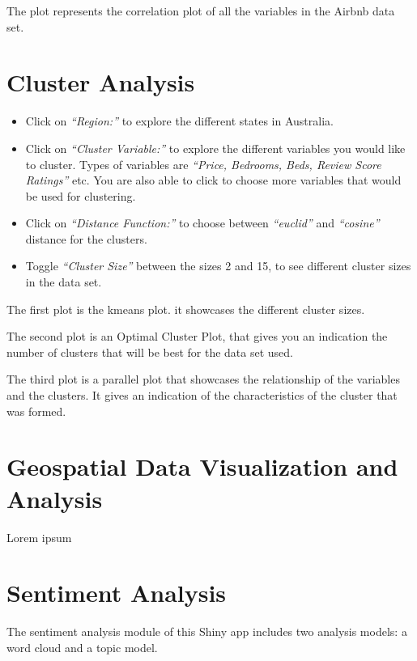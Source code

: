 \documentclass[
]{article}
\providecommand{\tightlist}{%
  \setlength{\itemsep}{0pt}\setlength{\parskip}{0pt}}
\begin{document}
The plot represents the correlation plot of all the variables in the
Airbnb data set.

\hypertarget{cluster-analysis}{%
\section{Cluster Analysis}\label{cluster-analysis}}

\begin{itemize}
\tightlist
\item
  Click on \emph{``Region:''} to explore the different states in
  Australia.
\item
  Click on \emph{``Cluster Variable:''} to explore the different
  variables you would like to cluster. Types of variables are
  \emph{``Price, Bedrooms, Beds, Review Score Ratings''} etc. You are
  also able to click to choose more variables that would be used for
  clustering.
\item
  Click on \emph{``Distance Function:''} to choose between
  \emph{``euclid''} and \emph{``cosine''} distance for the clusters.
\item
  Toggle \emph{``Cluster Size''} between the sizes 2 and 15, to see
  different cluster sizes in the data set.
\end{itemize}

The first plot is the kmeans plot. it showcases the different cluster
sizes.

The second plot is an Optimal Cluster Plot, that gives you an indication
the number of clusters that will be best for the data set used.

The third plot is a parallel plot that showcases the relationship of the
variables and the clusters. It gives an indication of the
characteristics of the cluster that was formed.

\hypertarget{geospatial-data-visualization-and-analysis}{%
\section{Geospatial Data Visualization and
Analysis}\label{geospatial-data-visualization-and-analysis}}

Lorem ipsum

\hypertarget{sentiment-analysis}{%
\section{Sentiment Analysis}\label{sentiment-analysis}}

The sentiment analysis module of this Shiny app includes two analysis
models: a word cloud and a topic model.
\end{document}
